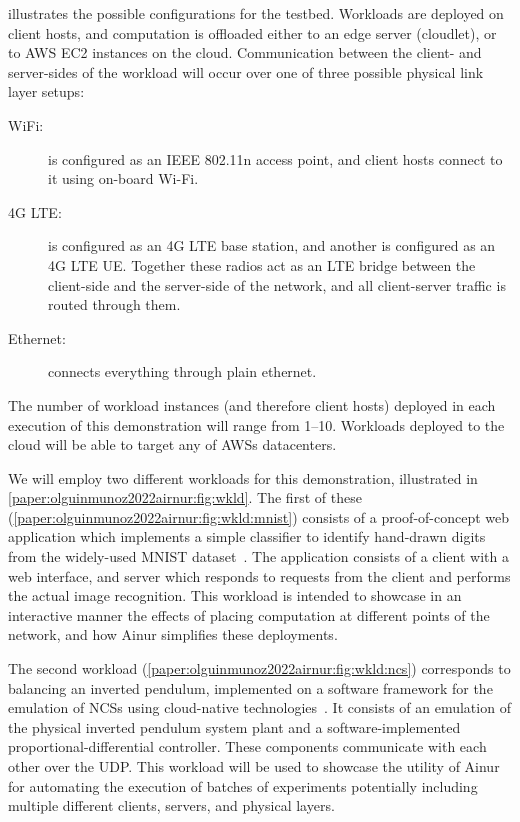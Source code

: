  illustrates the possible configurations for the testbed.
Workloads are deployed on client hosts, and computation is offloaded either to an edge server (cloudlet), or to \gls{AWS} \gls{EC2} instances on the cloud.
Communication between the client- and server-sides of the workload will occur over one of three possible physical link layer setups:
\begin{description}
    \item[WiFi:]  is configured as an IEEE 802.11n access point, and client hosts connect to it using on-board Wi-Fi.
    \item[4G \gls{LTE}:]  is configured as an 4G \gls{LTE} base station, and another is configured as an 4G \gls{LTE} \gls{UE}.
    Together these radios act as an \gls{LTE} bridge between the client-side and the server-side of the network, and all client-server traffic is routed through them.
    \item[Ethernet:] connects everything through plain ethernet.
\end{description}

The number of workload instances (and therefore client hosts) deployed in each execution of this demonstration will range from \numrange[]{1}{10}.
Workloads deployed to the cloud will be able to target any of \gls{AWS}s datacenters.

We will employ two different workloads for this demonstration, illustrated in \cref{paper:olguinmunoz2022airnur:fig:wkld}.
The first of these (\cref{paper:olguinmunoz2022airnur:fig:wkld:mnist}) consists of a proof-of-concept web application which implements a simple classifier to identify hand-drawn digits from the widely-used \gls{MNIST} dataset~\cite{deng2012mnist}.
The application consists of a client with a web interface, and  server which responds to requests from the client and performs the actual image recognition.
This workload is intended to showcase in an interactive manner the effects of placing computation at different points of the network, and how Ainur simplifies these deployments.

The second workload (\cref{paper:olguinmunoz2022airnur:fig:wkld:ncs}) corresponds to  balancing an inverted pendulum, implemented on a software framework for the emulation of \glspl{NCS} using cloud-native technologies~\cite{olguinmunoz2022cleave}.
It consists of an emulation of the physical inverted pendulum system plant and a software-implemented proportional-differential controller.
These components communicate with each other over the \gls{UDP}.
This workload will be used to showcase the utility of Ainur for automating the execution of batches of experiments potentially including multiple different clients, servers, and physical layers.

